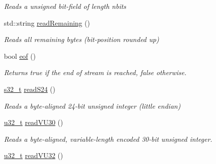 \begin{DoxyCompactItemize}
\begin{DoxyCompactList}\small\item\em Reads a unsigned bit-\/field of length {\ttfamily nbits} \end{DoxyCompactList}\item 
\hypertarget{classjswf_1_1io_1_1_string_reader_a4da4ef9c89f5c23c1a890912c5d416b6}{std\+::string \hyperlink{classjswf_1_1io_1_1_string_reader_a4da4ef9c89f5c23c1a890912c5d416b6}{read\+Remaining} ()}\label{classjswf_1_1io_1_1_string_reader_a4da4ef9c89f5c23c1a890912c5d416b6}

\begin{DoxyCompactList}\small\item\em Reads all remaining bytes (bit-\/position rounded up) \end{DoxyCompactList}\item 
\hypertarget{classjswf_1_1io_1_1_string_reader_a5820f44ae96ae632bac44821e2f48c01}{bool \hyperlink{classjswf_1_1io_1_1_string_reader_a5820f44ae96ae632bac44821e2f48c01}{eof} ()}\label{classjswf_1_1io_1_1_string_reader_a5820f44ae96ae632bac44821e2f48c01}

\begin{DoxyCompactList}\small\item\em Returns true if the end of stream is reached, false otherwise. \end{DoxyCompactList}\item 
\hypertarget{classjswf_1_1io_1_1_string_reader_a9f68d4083aca232bfef3c4f80dfe9c6a}{\hyperlink{namespacejswf_a19b2a5980fe3b05994a2127a3c7e0521}{s32\+\_\+t} \hyperlink{classjswf_1_1io_1_1_string_reader_a9f68d4083aca232bfef3c4f80dfe9c6a}{read\+S24} ()}\label{classjswf_1_1io_1_1_string_reader_a9f68d4083aca232bfef3c4f80dfe9c6a}

\begin{DoxyCompactList}\small\item\em Reads a byte-\/aligned 24-\/bit unsigned integer (little endian) \end{DoxyCompactList}\item 
\hypertarget{classjswf_1_1io_1_1_string_reader_af2b064506a4f395613d5d8b915506d10}{\hyperlink{namespacejswf_ae68dd480b6437e9a20db7b004283a466}{u32\+\_\+t} \hyperlink{classjswf_1_1io_1_1_string_reader_af2b064506a4f395613d5d8b915506d10}{read\+V\+U30} ()}\label{classjswf_1_1io_1_1_string_reader_af2b064506a4f395613d5d8b915506d10}

\begin{DoxyCompactList}\small\item\em Reads a byte-\/aligned, variable-\/length encoded 30-\/bit unsigned integer. \end{DoxyCompactList}\item 
\hypertarget{classjswf_1_1io_1_1_string_reader_a2ce0c1a1cde08073e9eb452344be96f8}{\hyperlink{namespacejswf_ae68dd480b6437e9a20db7b004283a466}{u32\+\_\+t} \hyperlink{classjswf_1_1io_1_1_string_reader_a2ce0c1a1cde08073e9eb452344be96f8}{read\+V\+U32} ()}\label{classjswf_1_1io_1_1_string_reader_a2ce0c1a1cde08073e9eb452344be96f8}


\end{DoxyCompactItemize}
